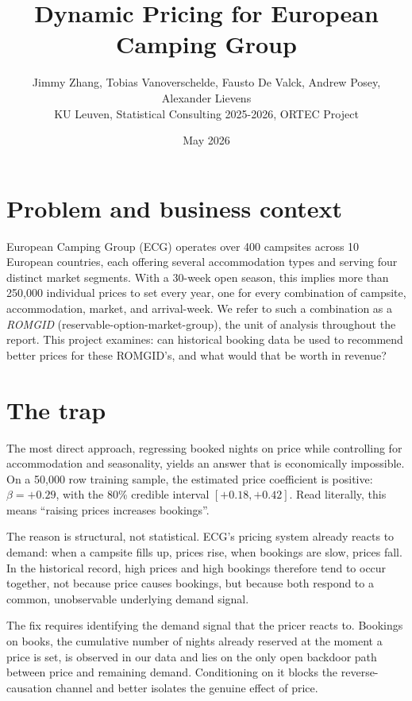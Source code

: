 \documentclass[11pt,a4paper]{article}
\title{Dynamic Pricing for European Camping Group}
\author{Jimmy Zhang, Tobias Vanoverschelde, Fausto De Valck, Andrew Posey,
Alexander Lievens \\ KU Leuven, Statistical Consulting 2025-2026, ORTEC Project}
\date{May 2026}
\begin{document}
\maketitle

\section{Problem and business context}

European Camping Group (ECG) operates over 400 campsites across 10 European countries, each offering several accommodation types and serving four distinct market segments. With a 30-week open season, this implies more than 250{,}000 individual prices to set every year, one for every combination of campsite, accommodation, market, and arrival-week. We refer to such a combination as a \emph{ROMGID} (reservable-option-market-group), the unit of analysis throughout the report. This project examines: can historical booking data be used to recommend better prices for these ROMGID's, and what would that be worth in revenue?

\section{The trap}

The most direct approach, regressing booked nights on price while controlling for accommodation and seasonality, yields an answer that is economically impossible. On a 50{,}000 row training sample, the estimated price coefficient is positive: $\beta = +0.29$, with the 80\% credible interval $[+0.18, +0.42]$. Read literally, this means ``raising prices increases bookings''.

The reason is structural, not statistical. ECG's pricing system already reacts to demand: when a campsite fills up, prices rise, when bookings are slow, prices fall. In the historical record, high prices and high bookings therefore tend to occur together, not because price causes bookings, but because both respond to a common, unobservable underlying demand signal.

The fix requires identifying the demand signal that the pricer reacts to. Bookings on books, the cumulative number of nights already reserved at the moment a price is set, is observed in our data and lies on the only open backdoor path between price and remaining demand. Conditioning on it blocks the reverse-causation channel and better isolates the genuine effect of price.
\end{document}

